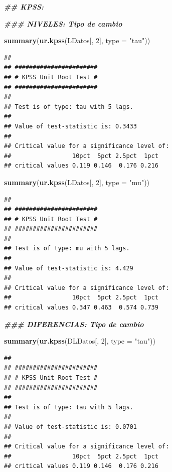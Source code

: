 \documentclass[
]{book}
\newenvironment{Shaded}{\begin{snugshade}}{\end{snugshade}}
\newcommand{\AttributeTok}[1]{\textcolor[rgb]{0.13,0.29,0.53}{#1}}
\newcommand{\DecValTok}[1]{\textcolor[rgb]{0.00,0.00,0.81}{#1}}
\newcommand{\DocumentationTok}[1]{\textcolor[rgb]{0.56,0.35,0.01}{\textbf{\textit{#1}}}}
\newcommand{\FunctionTok}[1]{\textcolor[rgb]{0.13,0.29,0.53}{\textbf{#1}}}
\newcommand{\NormalTok}[1]{#1}
\newcommand{\StringTok}[1]{\textcolor[rgb]{0.31,0.60,0.02}{#1}}
\begin{document}
\begin{Shaded}
\begin{Highlighting}[]
\DocumentationTok{\#\# KPSS: }

\DocumentationTok{\#\#\# NIVELES: Tipo de cambio}

\FunctionTok{summary}\NormalTok{(}\FunctionTok{ur.kpss}\NormalTok{(LDatos[, }\DecValTok{2}\NormalTok{], }\AttributeTok{type =} \StringTok{"tau"}\NormalTok{))}
\end{Highlighting}
\end{Shaded}

\begin{verbatim}
## 
## ####################### 
## # KPSS Unit Root Test # 
## ####################### 
## 
## Test is of type: tau with 5 lags. 
## 
## Value of test-statistic is: 0.3433 
## 
## Critical value for a significance level of: 
##                 10pct  5pct 2.5pct  1pct
## critical values 0.119 0.146  0.176 0.216
\end{verbatim}

\begin{Shaded}
\begin{Highlighting}[]
\FunctionTok{summary}\NormalTok{(}\FunctionTok{ur.kpss}\NormalTok{(LDatos[, }\DecValTok{2}\NormalTok{], }\AttributeTok{type =} \StringTok{"mu"}\NormalTok{))}
\end{Highlighting}
\end{Shaded}

\begin{verbatim}
## 
## ####################### 
## # KPSS Unit Root Test # 
## ####################### 
## 
## Test is of type: mu with 5 lags. 
## 
## Value of test-statistic is: 4.429 
## 
## Critical value for a significance level of: 
##                 10pct  5pct 2.5pct  1pct
## critical values 0.347 0.463  0.574 0.739
\end{verbatim}

\begin{Shaded}
\begin{Highlighting}[]
\DocumentationTok{\#\#\# DIFERENCIAS: Tipo de cambio}

\FunctionTok{summary}\NormalTok{(}\FunctionTok{ur.kpss}\NormalTok{(DLDatos[, }\DecValTok{2}\NormalTok{], }\AttributeTok{type =} \StringTok{"tau"}\NormalTok{))}
\end{Highlighting}
\end{Shaded}

\begin{verbatim}
## 
## ####################### 
## # KPSS Unit Root Test # 
## ####################### 
## 
## Test is of type: tau with 5 lags. 
## 
## Value of test-statistic is: 0.0701 
## 
## Critical value for a significance level of: 
##                 10pct  5pct 2.5pct  1pct
## critical values 0.119 0.146  0.176 0.216
\end{verbatim}
\end{document}
